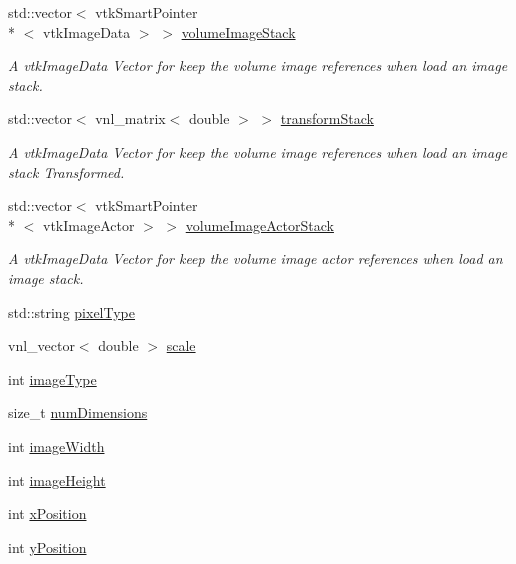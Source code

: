 \begin{DoxyCompactItemize}
std\-::vector$<$ vtk\-Smart\-Pointer\\*
$<$ vtk\-Image\-Data $>$ $>$ \hyperlink{class_q_v_t_k_image_widget_a2b96df48cde8c89ddb4a2a76c0b619c3}{volume\-Image\-Stack}
\begin{DoxyCompactList}\small\item\em A vtk\-Image\-Data Vector for keep the volume image references when load an image stack. \end{DoxyCompactList}\item 
std\-::vector$<$ vnl\-\_\-matrix$<$ double $>$ $>$ \hyperlink{class_q_v_t_k_image_widget_a39502e633f132da83233e9cbb1306196}{transform\-Stack}
\begin{DoxyCompactList}\small\item\em A vtk\-Image\-Data Vector for keep the volume image references when load an image stack Transformed. \end{DoxyCompactList}\item 
std\-::vector$<$ vtk\-Smart\-Pointer\\*
$<$ vtk\-Image\-Actor $>$ $>$ \hyperlink{class_q_v_t_k_image_widget_a0cdd7ea88a31d89a60352c27dc8bd556}{volume\-Image\-Actor\-Stack}
\begin{DoxyCompactList}\small\item\em A vtk\-Image\-Data Vector for keep the volume image actor references when load an image stack. \end{DoxyCompactList}\item 
std\-::string \hyperlink{class_q_v_t_k_image_widget_a067b78e68ed458d840ad1cf0d16b4ad6}{pixel\-Type}
\item 
vnl\-\_\-vector$<$ double $>$ \hyperlink{class_q_v_t_k_image_widget_a9c5324e5b044bf1e55f3205002d69da0}{scale}
\item 
int \hyperlink{class_q_v_t_k_image_widget_a132867322988e692c324f5cc66697341}{image\-Type}
\item 
size\-\_\-t \hyperlink{class_q_v_t_k_image_widget_a6aff403421ea538248d48116a942271b}{num\-Dimensions}
\item 
int \hyperlink{class_q_v_t_k_image_widget_a1ab611f7637a7885347b07ba9aa42e22}{image\-Width}
\item 
int \hyperlink{class_q_v_t_k_image_widget_acc1b249b96b147b447366361331ef60a}{image\-Height}
\item 
int \hyperlink{class_q_v_t_k_image_widget_afd88ea5dbed175232b0c15cbe4cdca89}{x\-Position}
\item 
int \hyperlink{class_q_v_t_k_image_widget_a6724caff3a614db8321deaa70532255c}{y\-Position}

\end{DoxyCompactItemize}
